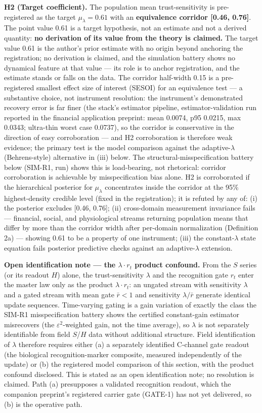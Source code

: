 \documentclass[11pt,twocolumn]{article}
\theoremstyle{gttdef}
\theoremstyle{gttplain}
\begin{document}
\textbf{H2 (Target coefficient).} The population mean trust-sensitivity is pre-registered as the target $\mu_\lambda = 0.61$ with an \textbf{equivalence corridor [0.46, 0.76]}. The point value 0.61 is a target hypothesis, not an estimate and not a derived quantity: \textbf{no derivation of its value from the theory is claimed.} The target value 0.61 is the author's prior estimate with no origin beyond anchoring the registration; no derivation is claimed, and the simulation battery shows no dynamical feature at that value --- its role is to anchor registration, and the estimate stands or falls on the data. The corridor half-width 0.15 is a pre-registered smallest effect size of interest (SESOI) for an equivalence test --- a substantive choice, not instrument resolution: the instrument's demonstrated recovery error is far finer (the stack's estimator pipeline, estimator-validation run reported in the financial application preprint: mean 0.0074, p95 0.0215, max 0.0343; ultra-thin worst case 0.0737), so the corridor is conservative in the direction of easy corroboration --- and H2 corroboration is therefore weak evidence; the primary test is the model comparison against the adaptive-$\lambda$ (Behrens-style) alternative in (iii) below. The structural-misspecification battery below (SIM-R1, run) shows this is load-bearing, not rhetorical: corridor corroboration is achievable by misspecification bias alone. H2 is corroborated if the hierarchical posterior for $\mu_\lambda$ concentrates inside the corridor at the 95\% highest-density credible level (fixed in the registration); it is refuted by any of: (i) the posterior excludes [0.46, 0.76]; (ii) cross-domain measurement invariance fails --- financial, social, and physiological streams returning population means that differ by more than the corridor width after per-domain normalization (Definition 2a) --- showing 0.61 to be a property of one instrument; (iii) the constant-$\lambda$ state equation fails posterior predictive checks against an adaptive-$\lambda$ extension.

\textbf{Open identification note --- the $\lambda \cdot r_t$ product confound.} From the $S$ series (or its readout $H$) alone, the trust-sensitivity $\lambda$ and the recognition gate $r_t$ enter the master law only as the product $\lambda \cdot r_t$: an ungated stream with sensitivity $\lambda$ and a gated stream with mean gate $\bar{r} < 1$ and sensitivity $\lambda/\bar{r}$ generate identical update sequences. Time-varying gating is a gain variation of exactly the class the SIM-R1 misspecification battery shows the certified constant-gain estimator misrecovers (the $\varepsilon^{2}$-weighted gain, not the time average), so $\lambda$ is not separately identifiable from field $S$/$H$ data without additional structure. Field identification of $\lambda$ therefore requires either (a) a separately identified C-channel gate readout (the biological recognition-marker composite, measured independently of the update) or (b) the registered model comparison of this section, with the product confound disclosed. This is stated as an open identification note; no resolution is claimed. Path (a) presupposes a validated recognition readout, which the companion preprint's registered carrier gate (GATE-1) has not yet delivered, so (b) is the operative path.
\end{document}
